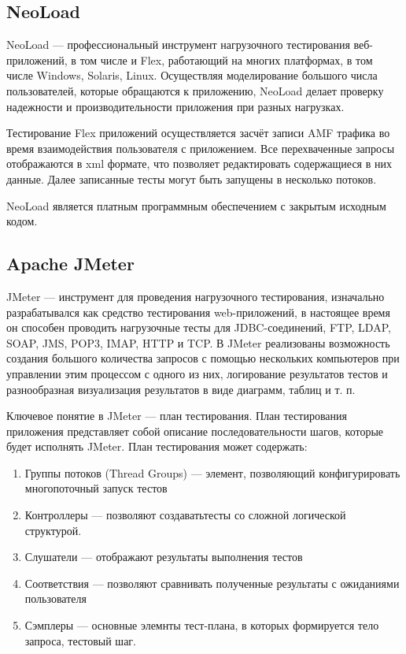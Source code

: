 \subsection{NeoLoad}

NeoLoad --- профессиональный инструмент нагрузочного тестирования веб-приложений,
в том числе и Flex, работающий на многих платформах, в том числе Windows, Solaris, Linux.
Осуществляя моделирование большого числа пользователей, которые обращаются 
к приложению, NeoLoad делает проверку надежности и производительности 
приложения при разных нагрузках.

Тестирование Flex приложений осуществляется засчёт записи AMF трафика во 
время взаимодействия пользователя с приложением. Все перехваченные запросы 
отображаются в xml формате, что позволяет редактировать содержащиеся в них 
данные. Далее записанные тесты могут быть запущены в несколько потоков.

NeoLoad является платным программным обеспечением с закрытым исходным кодом. 
 
\subsection{Apache JMeter}

JMeter --- инструмент для проведения нагрузочного тестирования, изначально
разрабатывался как средство тестирования web-приложений, в настоящее время 
он способен проводить нагрузочные тесты для JDBC-соединений, FTP, LDAP, SOAP, 
JMS, POP3, IMAP, HTTP и TCP. 
В JMeter реализованы возможность создания большого количества запросов с 
помощью нескольких компьютеров при управлении этим процессом с одного из них,
логирование результатов тестов и разнообразная визуализация результатов в
виде диаграмм, таблиц и т. п.

Ключевое понятие в JMeter –-- план тестирования. План тестирования приложения
представляет собой описание последовательности шагов, которые
будет исполнять JMeter. План тестирования может содержать:

\begin{enumerate}
\item Группы потоков (Thread Groups) --- элемент, позволяющий конфигурировать
многопоточный запуск тестов
\item Контроллеры --- позволяют создаватьтесты со сложной логической структурой.
\item Слушатели --- отображают результаты выполнения тестов
\item Соответствия --- позволяют сравнивать полученные результаты с
ожиданиями пользователя
\item Сэмплеры --- основные элемнты тест-плана, в которых формируется тело
запроса, тестовый шаг.
\end{enumerate}

